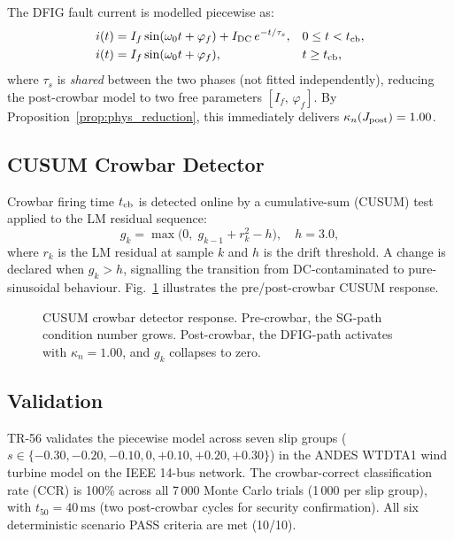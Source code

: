 \documentclass[journal,twoside]{IEEEtran}
\begin{document}
The DFIG fault current is modelled piecewise as:
\begin{align}
  i(t) &= I_f\sin(\omega_0 t + \varphi_f)
           + I_{\rm DC}\,e^{-t/\tau_s}, &&0 \leq t < t_{\rm cb},
  \label{eq:dfig_pre} \\
  i(t) &= I_f\sin(\omega_0 t + \varphi_f), &&t \geq t_{\rm cb},
  \label{eq:dfig_post}
\end{align}
where $\tau_s$ is \emph{shared} between the two phases (not fitted
independently), reducing the post-crowbar model to two free parameters
$[I_f,\,\varphi_f]$.
By Proposition~\ref{prop:phys_reduction}, this immediately delivers
$\kappa_n(J_{\rm post}) = 1.00$.

\subsection{CUSUM Crowbar Detector}
\label{sec:cusum}

Crowbar firing time $t_{\rm cb}$ is detected online by a cumulative-sum
(CUSUM) test applied to the LM residual sequence:
\begin{equation}
  g_k = \max\!\bigl(0,\; g_{k-1} + r_k^2 - h\bigr), \quad h = 3.0,
  \label{eq:cusum}
\end{equation}
where $r_k$ is the LM residual at sample $k$ and $h$ is the drift threshold.
A change is declared when $g_k > h$, signalling the transition from
DC-contaminated to pure-sinusoidal behaviour.
Fig.~\ref{fig:cusum} illustrates the pre/post-crowbar CUSUM response.

\begin{figure}[t]
  \centering
  
  \caption{CUSUM crowbar detector response. Pre-crowbar, the SG-path
    condition number grows. Post-crowbar, the DFIG-path
    activates with $\kappa_n = 1.00$, and $g_k$ collapses to zero.}
  \label{fig:cusum}
\end{figure}

\subsection{Validation}
\label{sec:dfig_val}

TR-56 validates the piecewise model across seven slip groups
($s \in \{-0.30, -0.20, -0.10, 0, +0.10, +0.20, +0.30\}$) in the ANDES
WTDTA1 wind turbine model on the IEEE 14-bus network.
The crowbar-correct classification rate (CCR) is 100\% across all 7\,000 Monte
Carlo trials (1\,000 per slip group), with $t_{50} = 40\,\text{ms}$
(two post-crowbar cycles for security confirmation).
All six deterministic scenario PASS criteria are met (10/10).
\end{document}
